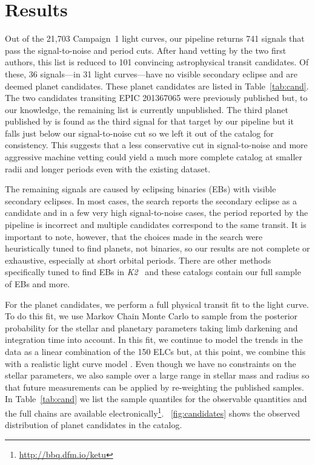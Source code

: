 \documentclass[12pt,preprint]{aastex}
\newcommand{\project}[1]{\textsl{#1}} %
\newcommand{\KT}{\project{K2}}
\newcommand{\figref}[1]{\ref{fig:#1}}
\newcommand{\Fig}[1]{\figurename~\figref{#1}}
\newcommand{\fig}[1]{\Fig{#1}}
\newcommand{\Tab}[1]{Table~\ref{tab:#1}}
\newcommand{\tab}[1]{\Tab{#1}}
\newcommand{\sectlabel}[1]{\label{sect:#1}}
\newcommand{\datareleaseurl}{{\url{http://bbq.dfm.io/ketu}}}
\begin{document}
\section{Results}
\sectlabel{results}

Out of the 21,703 Campaign~1 light curves, our pipeline returns 741 signals
that pass the signal-to-noise and period cuts.
After hand vetting by the two first authors, this list is reduced to 101
convincing astrophysical transit candidates.
Of these, 36 signals---in 31 light curves---have no visible secondary
eclipse and are deemed planet candidates.
These planet candidates are listed in \tab{cand}.
The two candidates transiting EPIC 201367065 were previously published
\citep{Crossfield:2015} but, to our knowledge, the remaining list is currently
unpublished.
The third planet published by \citet{Crossfield:2015} is found as the third
signal for that target by our pipeline but it falls just below our
signal-to-noise cut so we left it out of the catalog for consistency.
This suggests that a less conservative cut in signal-to-noise and more
aggressive machine vetting could yield a much more complete catalog at smaller
radii and longer periods even with the existing dataset.

The remaining signals are caused by eclipsing binaries (EBs) with visible
secondary eclipses.
In most cases, the search reports the secondary eclipse as a candidate and in
a few very high signal-to-noise cases, the period reported by the pipeline is
incorrect and multiple candidates correspond to the same transit.
It is important to note, however, that the choices made in the search were
heuristically tuned to find planets, not binaries, so our results are not
complete or exhaustive, especially at short orbital periods.
There are other methods specifically tuned to find EBs in \KT\
\citep[such as][]{Armstrong:2014, Armstrong:2015} and these catalogs contain
our full sample of EBs and more.

For the planet candidates, we perform a full physical transit fit to the light
curve.
To do this fit, we use Markov Chain Monte Carlo \citep[MCMC;][]{emcee} to
sample from the posterior probability for the stellar and planetary
parameters taking limb darkening and integration time into account.
In this fit, we continue to model the trends in the data as a linear
combination of the 150 ELCs but, at this point, we combine this with a
realistic light curve model \citet{ma, kipping-ld}.
Even though we have no constraints on the stellar parameters, we also sample
over a large range in stellar mass and radius so that future measurements can
be applied by re-weighting the published samples.
In \tab{cand} we list the sample quantiles for the observable quantities and
the full chains are available electronically\footnote{\datareleaseurl}.
\fig{candidates} shows the observed distribution of planet candidates in the
catalog.
\end{document}
